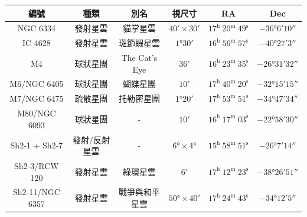 \begin{center}
\begin{longtable}{c | c | c | c | c | c}
    編號 & 種類 & 別名 & 視尺寸 & RA & Dec \\
    \hline
    \endfirsthead


    \endfoot

    \endlastfoot

    NGC 6334 & 發射星雲 & 貓掌星雲 & \(\ang{;40;} \times \ang{;30;}\) & \(17^\text{h }20^\text{m }49^\text{s}\) & \(-\ang{36;6;10}\) \\ %
    IC 4628 & 發射星雲 & 斑節蝦星雲 & \(\ang{1;30;}\) & \(16^\text{h }56^\text{m }57^\text{s}\) & \(-\ang{40;27;3}\) \\ %
    M4 & 球狀星團 & The Cat's Eye & \(\ang{;36;}\) & \(16^\text{h }23^\text{m }35^\text{s}\) & \(-\ang{26;31;32}\) \\ %
    M6/NGC 6405 & 球狀星團 & 蝴蝶星團 & \(\ang{;10;}\) & \(17^\text{h }40^\text{m }20^\text{s}\) & \(-\ang{32;15;15}\) \\ %
    M7/NGC 6475 & 疏散星團 & 托勒密星團 & \(\ang{1;20;}\) & \(17^\text{h }53^\text{m }51^\text{s}\) & \(-\ang{34;47;34}\) \\ %
    M80/NGC 6093 & 球狀星團 & - & \(\ang{;10;}\) & \(16^\text{h }17^\text{m }03^\text{s}\) & \(-\ang{22;58;30}\) \\ %
    Sh2-1 + Sh2-7 & 發射/反射星雲 & - & \(\ang{6;;} \times \ang{4;;}\) & \(15^\text{h }58^\text{m }51^\text{s}\) & \(-\ang{26;7;14}\) \\ %
    Sh2-3/RCW 120 & 發射星雲 & 綠環星雲 & \(\ang{;6;}\) & \(17^\text{h }12^\text{m }23^\text{s}\) & \(-\ang{38;26;51}\) \\ %
    Sh2-11/NGC 6357 & 發射星雲 & 戰爭與和平星雲 & \(\ang{50;;} \times \ang{;40;}\) & \(17^\text{h }24^\text{m }43^\text{s}\) & \(-\ang{34;12;5}\) \\ %

\end{longtable}
\end{center}


